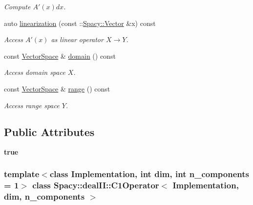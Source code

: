\begin{DoxyCompactItemize}
\begin{DoxyCompactList}\small\item\em \-Compute $A'(x)dx$. \end{DoxyCompactList}\item 
auto \hyperlink{classSpacy_1_1dealII_1_1C1Operator_ae7ba9047a7820487092dc4609645d90d}{linearization} (const \-::\hyperlink{classSpacy_1_1Vector}{\-Spacy\-::\-Vector} \&x) const 
\begin{DoxyCompactList}\small\item\em \-Access $A'(x)$ as linear operator $X\rightarrow Y$. \end{DoxyCompactList}\item 
\hypertarget{classSpacy_1_1OperatorBase_a2588f9b3e0188820c4c494e63293dc6f}{const \hyperlink{classSpacy_1_1VectorSpace}{\-Vector\-Space} \& \hyperlink{classSpacy_1_1OperatorBase_a2588f9b3e0188820c4c494e63293dc6f}{domain} () const }\label{classSpacy_1_1OperatorBase_a2588f9b3e0188820c4c494e63293dc6f}

\begin{DoxyCompactList}\small\item\em \-Access domain space $X$. \end{DoxyCompactList}\item 
\hypertarget{classSpacy_1_1OperatorBase_ab19d3b7a6f290b1079248f1e567e53d6}{const \hyperlink{classSpacy_1_1VectorSpace}{\-Vector\-Space} \& \hyperlink{classSpacy_1_1OperatorBase_ab19d3b7a6f290b1079248f1e567e53d6}{range} () const }\label{classSpacy_1_1OperatorBase_ab19d3b7a6f290b1079248f1e567e53d6}

\begin{DoxyCompactList}\small\item\em \-Access range space $Y$. \end{DoxyCompactList}\end{DoxyCompactItemize}
\subsection*{\-Public \-Attributes}
\begin{DoxyCompactItemize}
\item 
\hypertarget{classSpacy_1_1dealII_1_1C1Operator_a9887f41e0f0637d40849d048222f165c}{{\bfseries true}}\label{classSpacy_1_1dealII_1_1C1Operator_a9887f41e0f0637d40849d048222f165c}

\end{DoxyCompactItemize}
\subsubsection*{template$<$class Implementation, int dim, int n\-\_\-components = 1$>$ class Spacy\-::deal\-I\-I\-::\-C1\-Operator$<$ Implementation, dim, n\-\_\-components $>$}



